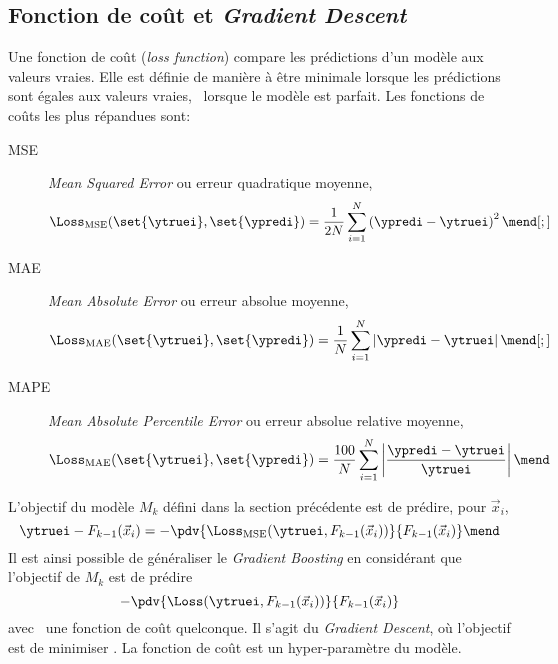 \subsection{Fonction de coût et \emph{Gradient Descent}}\label{chapter-ML-section-loss}
Une fonction de coût (\emph{loss function}) compare les prédictions d'un modèle aux valeurs vraies.
Elle est définie de manière à être minimale lorsque les prédictions sont égales aux valeurs vraies, \ie\ lorsque le modèle est parfait.
Les fonctions de coûts les plus répandues sont:
\begin{description}
\item[MSE] \emph{Mean Squared Error} ou erreur quadratique moyenne,
\begin{equation}
\Loss_\text{MSE}(\set{\ytruei}, \set{\ypredi}) = \frac{1}{2N} \sum_{i=1}^N \left( \ypredi - \ytruei \right)^2
\label{eq-loss_MSE}
\mend[;]
\end{equation}
\item[MAE] \emph{Mean Absolute Error} ou erreur absolue moyenne,
\begin{equation}
\Loss_\text{MAE}(\set{\ytruei}, \set{\ypredi}) = \frac{1}{N} \sum_{i=1}^N \left| \ypredi - \ytruei \right|
\label{eq-loss_MAE}
\mend[;]
\end{equation}
\item[MAPE] \emph{Mean Absolute Percentile Error} ou erreur absolue relative moyenne,
\begin{equation}
\Loss_\text{MAE}(\set{\ytruei}, \set{\ypredi}) = \frac{100}{N} \sum_{i=1}^N \left| \frac{\ypredi - \ytruei}{\ytruei} \right|
\label{eq-loss_MAPE}
\mend
\end{equation}
\end{description}
\par
L'objectif du modèle $M_k$ défini dans la section précédente est de prédire, pour $\vec{x}_i$,
\begin{equation}
\ytruei - F_{k-1}(\vec{x}_i)
=
- \pdv{\Loss_\text{MSE}(\ytruei, F_{k-1}(\vec{x}_i))}{F_{k-1}(\vec{x}_i)}
\mend
\end{equation}
Il est ainsi possible de généraliser le \emph{Gradient Boosting}
en considérant que l'objectif de $M_k$ est de prédire
\begin{equation}
- \pdv{\Loss(\ytruei, F_{k-1}(\vec{x}_i))}{F_{k-1}(\vec{x}_i)}
\end{equation}
avec \Loss\ une fonction de coût quelconque.
Il s'agit du \emph{Gradient Descent},
où l'objectif est de minimiser \Loss.
La fonction de coût est un hyper-paramètre du modèle.

